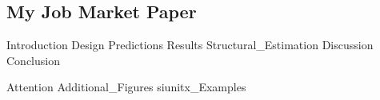 \documentclass[11pt, a4paper, twoside]{book}
\begin{document}
\begin{refsection}

\makeatletter
\renewcommand{\@makefntext}[1]{\@makefntextorig{#1}}
\makeatother
\chapter
	[My Job Market Paper]
	{My Job Market Paper%
	 \setcounter{footnote}{1}\textsuperscript{\Large{}}%
	}
\label{diss:JMP}
\renewcommand{\thefootnote}{\fnsymbol{footnote}}
\footnotetext[1]{\:\protect}
\renewcommand{\thefootnote}{\thefootnoteorig}
\makeatletter
\renewcommand{\@makefntext}[1]{\@makefntextcustom{#1}}
\renewcommand{\@makefnmark}{\@makefnmarkorig}
\makeatother
\setcounter{footnote}{0}

\graphicspath{{1_Example_Content/}}
{Introduction}
{Design}
{Predictions}
{Results}
{Structural_Estimation}
{Discussion}
{Conclusion}

\begin{subappendices}
	\label{sec:appendix}
	\FloatBarrier
	{Attention}
	\FloatBarrier
	\newpage
	{Additional_Figures}
	\FloatBarrier
	{siunitx_Examples}
	\clearpage
\end{subappendices}

\begin{refcontext}[sorting=nyt]
	\printbibliography[heading=subbibliography]
\end{refcontext}

\end{refsection}


\end{document}
